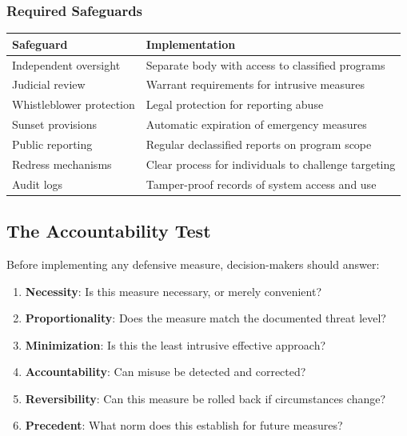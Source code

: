 \documentclass[11pt,letterpaper]{article}
\begin{document}
\subsubsection{Required Safeguards}

\begin{center}
\small
\begin{tabular}{L{4cm}L{8cm}}
\toprule
\textbf{Safeguard} & \textbf{Implementation} \\
\midrule
Independent oversight & Separate body with access to classified programs \\
Judicial review & Warrant requirements for intrusive measures \\
Whistleblower protection & Legal protection for reporting abuse \\
Sunset provisions & Automatic expiration of emergency measures \\
Public reporting & Regular declassified reports on program scope \\
Redress mechanisms & Clear process for individuals to challenge targeting \\
Audit logs & Tamper-proof records of system access and use \\
\bottomrule
\end{tabular}
\end{center}

\subsection{The Accountability Test}

Before implementing any defensive measure, decision-makers should answer:

\begin{enumerate}
  \item \textbf{Necessity}: Is this measure necessary, or merely convenient?
  \item \textbf{Proportionality}: Does the measure match the documented threat level?
  \item \textbf{Minimization}: Is this the least intrusive effective approach?
  \item \textbf{Accountability}: Can misuse be detected and corrected?
  \item \textbf{Reversibility}: Can this measure be rolled back if circumstances change?
  \item \textbf{Precedent}: What norm does this establish for future measures?
\end{enumerate}
\end{document}

